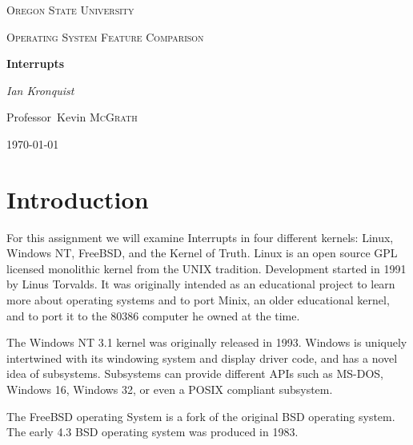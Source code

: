 \documentclass[10pt,conference,draftclsnofoot,onecolumn]{IEEEtran}
\begin{document}
\begin{titlepage}
    \centering
    {\scshape\LARGE Oregon State University \par}
    \vspace{1cm}
    {\scshape\Large Operating System Feature Comparison \par}
    \vspace{1.5cm}
    {\huge\bfseries Interrupts \par}
    \vspace{2cm}
    {\Large\itshape Ian Kronquist \par}
    \vfill
    \par
    Professor~Kevin \textsc{McGrath}

    \vfill

    {\large \today\par}
\end{titlepage}


\author{
}

\bigskip

\section{Introduction}
For this assignment we will examine Interrupts in four different kernels: Linux, Windows NT, FreeBSD, and the Kernel of Truth.
Linux is an open source GPL licensed monolithic kernel from the UNIX tradition. Development started in 1991 by Linus Torvalds. It was originally intended as an educational project to learn more about operating systems and to port Minix, an older educational kernel, and to port it to the 80386 computer he owned at the time\cite{1_love_2010}.

The Windows NT 3.1 kernel was originally released in 1993. Windows is uniquely intertwined with its windowing system and display driver code, and has a novel idea of subsystems. Subsystems can provide different APIs such as MS-DOS, Windows 16, Windows 32, or even a POSIX compliant subsystem\cite{2_russinovich_solomon_ionescu_2012}.

The FreeBSD operating System is a fork of the original BSD operating system. The early 4.3 BSD operating system was produced in 1983\cite{3_mckusick_neville-neil_watson_2015}.
\end{document}
